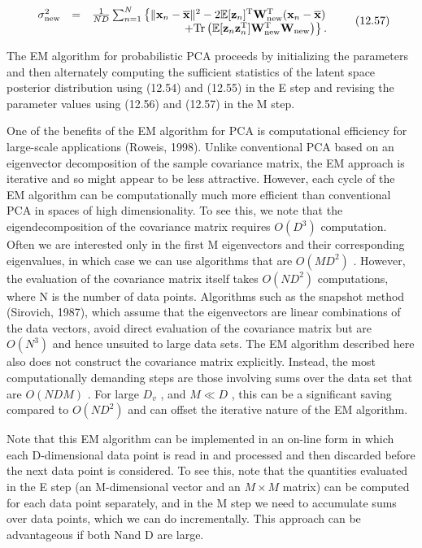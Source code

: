 \documentclass[
  10
]{article}
\begin{document}
\[
\begin{array}{r l r} \sigma_ {\mathrm{new}} ^ {2} & = & \frac {1}{N D} \sum_ {n = 1} ^ {N} \left\{\| \mathbf {x} _ {n} - \overline {{\mathbf {x}}} \| ^ {2} - 2 \mathbb {E} [ \mathbf {z} _ {n} ] ^ {\mathrm{T}} \mathbf {W} _ {\mathrm{new}} ^ {\mathrm{T}} (\mathbf {x} _ {n} - \overline {{\mathbf {x}}}) \right. \\ & & \left. + \mathrm{Tr} \left(\mathbb {E} [ \mathbf {z} _ {n} \mathbf {z} _ {n} ^ {\mathrm{T}} ] \mathbf {W} _ {\mathrm{new}} ^ {\mathrm{T}} \mathbf {W} _ {\mathrm{new}}\right) \right\}. \end{array}\tag{12.57}
\]

The EM algorithm for probabilistic PCA proceeds by initializing the
parameters and then alternately computing the sufficient statistics of
the latent space posterior distribution using (12.54) and (12.55) in the
E step and revising the parameter values using (12.56) and (12.57) in
the M step.

One of the benefits of the EM algorithm for PCA is computational
efficiency for large-scale applications (Roweis, 1998). Unlike
conventional PCA based on an eigenvector decomposition of the sample
covariance matrix, the EM approach is iterative and so might appear to
be less attractive. However, each cycle of the EM algorithm can be
computationally much more efficient than conventional PCA in spaces of
high dimensionality. To see this, we note that the eigendecomposition of
the covariance matrix requires \(O ( D ^ { 3 } )\) computation. Often we
are interested only in the first M eigenvectors and their corresponding
eigenvalues, in which case we can use algorithms that are
\(O ( M D ^ { 2 } )\) . However, the evaluation of the covariance matrix
itself takes \(O ( N D ^ { 2 } )\) computations, where N is the number
of data points. Algorithms such as the snapshot method (Sirovich, 1987),
which assume that the eigenvectors are linear combinations of the data
vectors, avoid direct evaluation of the covariance matrix but are
\(O ( N ^ { 3 } )\) and hence unsuited to large data sets. The EM
algorithm described here also does not construct the covariance matrix
explicitly. Instead, the most computationally demanding steps are those
involving sums over the data set that are \(O ( N D M )\) . For large
\(D _ { v }\) , and \(M \ll D\) , this can be a significant saving
compared to \(O ( N D ^ { 2 } )\) and can offset the iterative nature of
the EM algorithm.

Note that this EM algorithm can be implemented in an on-line form in
which each D-dimensional data point is read in and processed and then
discarded before the next data point is considered. To see this, note
that the quantities evaluated in the E step (an M-dimensional vector and
an \(M \times M\) matrix) can be computed for each data point
separately, and in the M step we need to accumulate sums over data
points, which we can do incrementally. This approach can be advantageous
if both Nand D are large.
\end{document}
